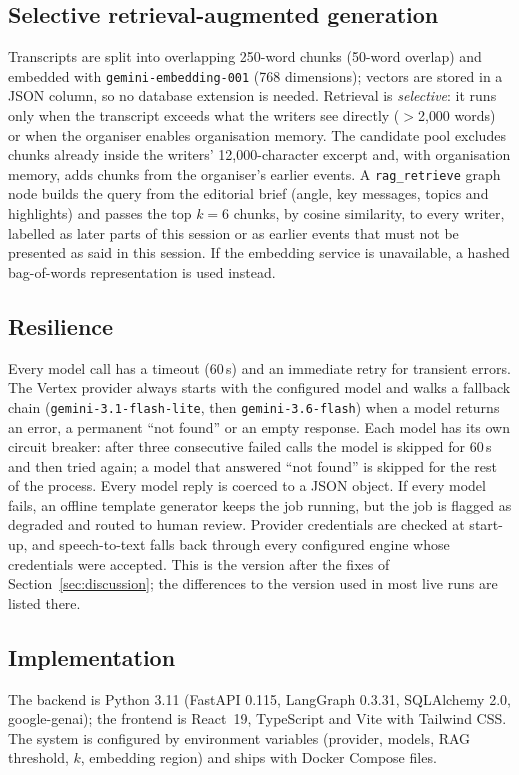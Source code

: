 \subsection{Selective retrieval-augmented generation}\label{sec:rag}
Transcripts are split into overlapping 250-word chunks (50-word overlap) and embedded with
\texttt{gemini-embedding-001} (768 dimensions); vectors are stored in a JSON column, so no
database extension is needed. Retrieval is \emph{selective}: it runs only when the
transcript exceeds what the writers see directly ($>$2{,}000 words) or when the organiser
enables organisation memory. The candidate pool excludes chunks already inside the writers'
12{,}000-character excerpt and, with organisation memory, adds chunks from the organiser's
earlier events. A \texttt{rag\_retrieve} graph node builds the query from the editorial
brief (angle, key messages, topics and highlights) and passes the top $k{=}6$ chunks, by
cosine similarity, to every writer, labelled as later parts of this session or as earlier
events that must not be presented as said in this session. If the embedding service is
unavailable, a hashed bag-of-words representation is used instead.

\subsection{Resilience}
Every model call has a timeout (60\,s) and an immediate retry for transient errors. The
Vertex provider always starts with the configured model and walks a fallback chain
(\texttt{gemini-3.1-flash-lite}, then \texttt{gemini-3.6-flash}) when a model returns an
error, a permanent ``not found'' or an empty response. Each model has its own circuit
breaker: after three consecutive failed calls the model is skipped for 60\,s and then tried
again; a model that answered ``not found'' is skipped for the rest of the process. Every
model reply is coerced to a JSON object. If every model fails, an offline template generator
keeps the job running, but the job is flagged as degraded and routed to human review.
Provider credentials are checked at start-up, and speech-to-text falls back through every
configured engine whose credentials were accepted. This is the version after the fixes of
Section~\ref{sec:discussion}; the differences to the version used in most live runs are
listed there.

\subsection{Implementation}
The backend is Python 3.11 (FastAPI 0.115, LangGraph 0.3.31, SQLAlchemy 2.0, google-genai);
the frontend is React~19, TypeScript and Vite with Tailwind CSS. The system is configured by
environment variables (provider, models, RAG threshold, $k$, embedding region) and ships with
Docker Compose files.
